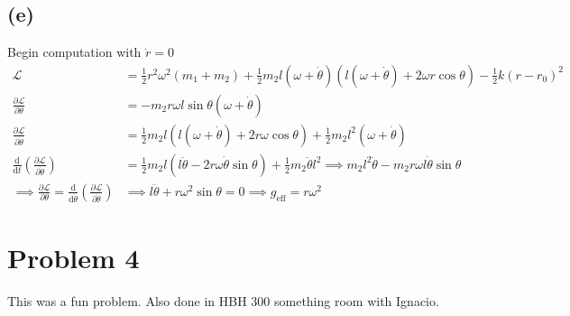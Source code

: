 \documentclass[letter, 10pts]{article}
\begin{document}
\subsection*{(e)} 
Begin computation with $\dot r = 0$ 
\begin{align*}
	\mathcal L &= \frac{1}{2} r^2 \omega^2(m_1 + m_2) + 
	\frac{1}{2} m_2 l ( \omega + \dot \theta) 
	\left(l (\omega + \dot \theta) + 2 \omega r \cos \theta \right)
	- \frac{1}{2} k (r- r_0)^2 \\
	\frac{\partial \mathcal L}{\partial \theta} &= - m_2 r \omega l \sin \theta( \omega + \dot \theta) \\ 
	\frac{\partial \mathcal L}{\partial \dot \theta} &=  \frac{1}{2} m_2 l (l (\omega + \dot \theta)+ 2 r \omega \cos \theta ) + \frac{1}{2} m_2 l^2( \omega + \dot \theta)\\
	\frac{\mathrm{d} }{\mathrm{d} t} 
	\left(
\frac{\partial \mathcal L}{\partial \dot \theta}
	\right) &= 
	\frac{1}{2} m_2 l 
	\left(
l \ddot{\theta} - 2 r \omega \dot{\theta} \sin \theta 		
	\right)+ 
	\frac{1}{2} m_2 \ddot{\theta} l^2 	
	\implies  m_2 l^2 \ddot{\theta} - m_2 r \omega l \dot{\theta} \sin \theta \\
	\implies 
	\frac{\partial \mathcal L}{\partial \theta} = 
	\frac{\mathrm{d} }{\mathrm{d} \dot{\theta}} \left(\frac{\partial \mathcal L}{\partial \dot{\theta}}\right) &\implies l \ddot{\theta} + r \omega ^2 \sin \theta = 0 \implies 
	\boxed{
	g_\text{eff} = r  \omega^2
	}
\end{align*}





\newpage
\section*{Problem 4}
This was a fun problem. Also done in HBH 300 something room with Ignacio.
\end{document}

